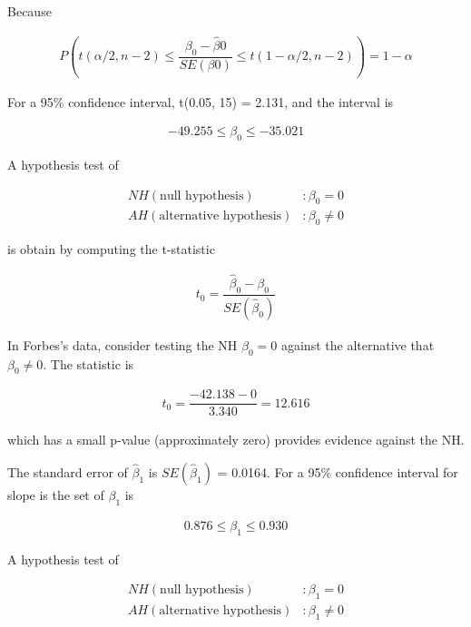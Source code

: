 \documentclass{article}
\begin{document}
    Because 
    
    \begin{align}
        P \left( t(\alpha /2, n - 2) \le \dfrac{\beta_{0} - \hat\beta{0}}{SE(\beta{0})} \le t(1 - \alpha /2, n - 2)\right) = 1 - \alpha \nonumber 
    \end{align}
    
    For a 95$\%$ confidence interval, t(0.05, 15) = 2.131, and the interval is 
    
    \begin{align}
        -49.255 \le \beta_{0} \le -35.021 \nonumber 
    \end{align}
    
    A hypothesis test of
    
    \begin{align}
       NH (\text{null hypothesis}) &: \beta_{0} = 0 \nonumber \\ 
       AH (\text{alternative hypothesis}) &:  \beta_{0} \ne 0 \nonumber 
    \end{align}
    
    is obtain by computing the t-statistic 
    
    \begin{align}
       t_{0} = \dfrac{\hat\beta_{0} - \beta_{0}}{SE(\hat\beta_{0})} \nonumber 
    \end{align}
    
    In Forbes's data, consider testing the NH $\beta_{0} = 0$ against the alternative that $\beta_{0} \neq 0$. The statistic is 
    
    \begin{align}
       t_{0} = \dfrac{-42.138 - 0}{3.340} = 12.616 \nonumber 
    \end{align}
    
    which has a small p-value (approximately zero) provides evidence against the NH. 
    
    The standard error of $\hat\beta_{1}$ is $SE(\hat\beta_{1})$ = 0.0164. For a 95$\%$ confidence interval for slope is the set of $\beta_{1}$ is 

    \begin{align}
        0.876 \le \beta_{1} \le 0.930 \nonumber 
    \end{align}
     
    A hypothesis test of 
    
    \begin{align}
       NH (\text{null hypothesis}) &: \beta_{1} = 0 \nonumber \\ 
       AH (\text{alternative hypothesis}) &:  \beta_{1} \ne 0 \nonumber 
    \end{align}
     
\end{document}
